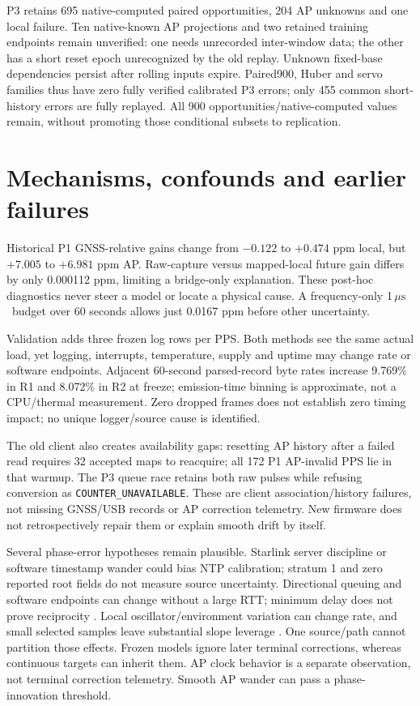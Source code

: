 \documentclass[10pt,letterpaper]{article}
\newcommand{\us}{\ensuremath{\,\mu\mathrm{s}}}
\begin{document}
P3 retains 695 native-computed paired opportunities, 204 AP unknowns and one
local failure. Ten native-known AP projections and two retained training
endpoints remain unverified: one needs unrecorded inter-window data; the other
has a short reset epoch unrecognized by the old replay. Unknown fixed-base
dependencies persist after rolling inputs expire. Paired900, Huber and servo
families thus have zero fully verified calibrated P3 errors; only 455 common
short-history errors are fully replayed. All 900 opportunities/native-computed
values remain, without promoting those conditional subsets to replication.

\section{Mechanisms, confounds and earlier failures}
Historical P1 GNSS-relative gains change from $-0.122$ to $+0.474$ ppm local,
but $+7.005$ to $+6.981$ ppm AP. Raw-capture versus mapped-local future gain
differs by only 0.000112 ppm, limiting a bridge-only explanation. These post-hoc
diagnostics never steer a model or locate a physical cause. A frequency-only
1\us\ budget over 60 seconds allows just 0.0167 ppm before other uncertainty.

Validation adds three frozen log rows per PPS. Both methods see the same actual
load, yet logging, interrupts, temperature, supply and uptime may change rate
or software endpoints. Adjacent 60-second parsed-record byte rates increase
9.769\% in R1 and 8.072\% in R2 at freeze; emission-time binning is approximate,
not a CPU/thermal measurement. Zero dropped frames does not establish zero
timing impact; no unique logger/source cause is identified.

The old client also creates availability gaps: resetting AP history after a
failed read requires 32 accepted maps to reacquire; all 172 P1 AP-invalid PPS
lie in that warmup. The P3 queue race retains both raw pulses while refusing
conversion as \texttt{COUNTER\_UNAVAILABLE}. These are client association/history
failures, not missing GNSS/USB records or AP correction telemetry. New firmware
does not retrospectively repair them or explain smooth drift by itself.

Several phase-error hypotheses remain plausible. Starlink server discipline
or software timestamp wander could bias NTP calibration; stratum 1 and zero
reported root fields do not measure source uncertainty. Directional queuing
and software endpoints can change without a large RTT; minimum delay does not
prove reciprocity \citep{nist2016}. Local oscillator/environment variation can
change rate, and small selected samples leave substantial slope leverage
\citep{riley}. One source/path cannot partition those effects. Frozen models
ignore later terminal corrections, whereas continuous targets can inherit
them. AP clock behavior is a separate observation, not terminal correction
telemetry. Smooth AP wander can pass a phase-innovation threshold.
\end{document}
